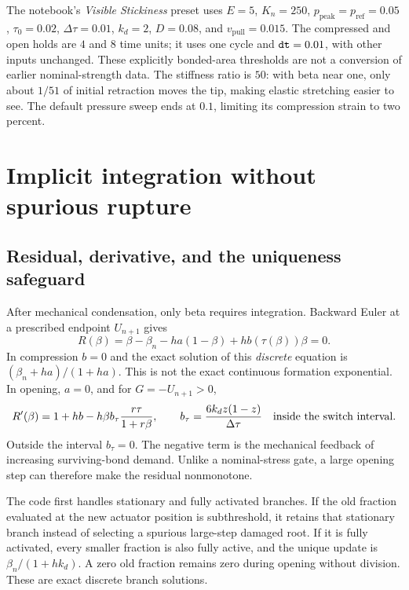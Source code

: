 \documentclass[11pt,a4paper]{article}
\newcommand{\code}[1]{\texttt{\detokenize{#1}}}
\begin{document}
The notebook's \emph{Visible Stickiness} preset uses $E=5$, $K_n=250$,
$p_{\mathrm{peak}}=p_{\mathrm{ref}}=0.05$, $\tau_0=0.02$,
$\Delta\tau=0.01$, $k_d=2$, $D=0.08$, and $v_{\mathrm{pull}}=0.015$.
The compressed and open holds are $4$ and $8$ time units; it uses one cycle
and $\code{dt}=0.01$, with other inputs unchanged. These explicitly
bonded-area thresholds are not a conversion of earlier nominal-strength data.
The stiffness ratio is $50$: with beta near one, only about $1/51$ of initial
retraction moves the tip, making elastic stretching easier to see. The default
pressure sweep ends at $0.1$, limiting its compression strain to two percent.

\section{Implicit integration without spurious rupture}

\subsection{Residual, derivative, and the uniqueness safeguard}

After mechanical condensation, only beta requires integration. Backward Euler
at a prescribed endpoint $U_{n+1}$ gives
\begin{equation}
 R(\beta)=\beta-\beta_n-ha(1-\beta)+h b(\tau(\beta))\beta=0.
 \label{eq:be}
\end{equation}
In compression $b=0$ and the exact solution of this \emph{discrete} equation
is $(\beta_n+ha)/(1+ha)$. This is not the exact continuous formation
exponential. In opening, $a=0$, and for $G=-U_{n+1}>0$,
\begin{equation}
 R'(\beta)=1+hb-h\beta b_\tau\frac{r\tau}{1+r\beta},\qquad
 b_\tau=\frac{6k_dz(1-z)}{\Delta\tau}
 \quad\hbox{inside the switch interval}.
 \label{eq:derivative}
\end{equation}
Outside the interval $b_\tau=0$. The negative term is the mechanical feedback
of increasing surviving-bond demand. Unlike a nominal-stress gate, a large
opening step can therefore make the residual nonmonotone.

The code first handles stationary and fully activated branches. If the old
fraction evaluated at the new actuator position is subthreshold, it retains
that stationary branch instead of selecting a spurious large-step damaged
root. If it is fully activated, every smaller fraction is also fully active,
and the unique update is $\beta_n/(1+hk_d)$. A zero old fraction remains zero
during opening without division. These are exact discrete branch solutions.
\end{document}
